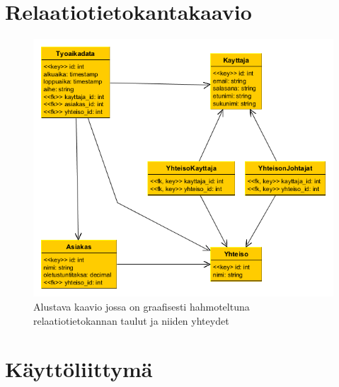 \documentclass[a4paper, 12pt finnish]{article}
\begin{document}
\newpage
\section{Relaatiotietokantakaavio}
\begin{figure}[htbp]
    \centering
    \includegraphics[width=1\textwidth]{relaatiokaavio.png}
    \caption{\small Alustava kaavio jossa on graafisesti hahmoteltuna
    relaatiotietokannan taulut ja niiden yhteydet}
\end{figure}

\section{Käyttöliittymä}
\end{document}
